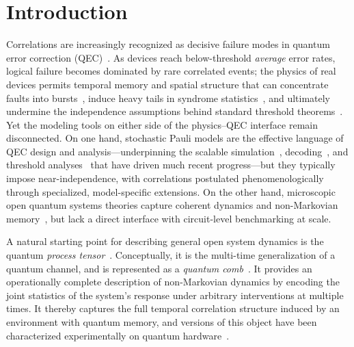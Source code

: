 \documentclass[
    aps,
    prx,
    reprint,
    superscriptaddress,
    longbibliography,
    nofootinbib,
    floatfix,
]{revtex4-2}
\begin{document}
\section{Introduction}\label{sec:introduction}
Correlations are increasingly recognized as decisive failure modes in quantum error correction (QEC)~\cite{harperLearningCorrelatedNoise2023,fkamDetrimentalNonMarkovianErrors2025}. As devices reach below-threshold \emph{average} error rates, logical failure becomes dominated by rare correlated events; the physics of real devices permits temporal memory and spatial structure that can concentrate faults into bursts~\cite{mcewenRemovingLeakageinducedCorrelated2021,mcewenResolvingCatastrophicError2022,googlequantumaiandcollaboratorsQuantumErrorCorrection2025,bratrudMeasurementCorrelatedCharge2025,harringtonSynchronousDetectionCosmic2025}, induce heavy tails in syndrome statistics~\cite{claderImpactCorrelationsHeavy2021}, and ultimately undermine the independence assumptions behind standard threshold theorems~\cite{terhalFaulttolerantQuantumComputation2005,aharonovFaultTolerantQuantumComputation2006,alickiInternalConsistencyFaulttolerant2006}. Yet the modeling tools on either side of the physics--QEC interface remain disconnected. On one hand, stochastic Pauli models are the effective language of QEC design and analysis---underpinning the scalable simulation~\cite{gidneyStimFastStabilizer2021}, decoding~\cite{higgottPyMatchingPythonPackage2022,higgottSparseBlossomCorrecting2025}, and threshold analyses~\cite{dennisTopologicalQuantumMemory2002,fowlerSurfaceCodesPractical2012} that have driven much recent progress---but they typically impose near-independence, with correlations postulated phenomenologically through specialized, model-specific extensions. On the other hand, microscopic open quantum systems theories capture coherent dynamics and non-Markovian memory~\cite{breuerTheoryOpenQuantum2007,breuerColloquiumNonMarkovianDynamics2016,milzQuantumStochasticProcesses2021}, but lack a direct interface with circuit-level benchmarking at scale.

A natural starting point for describing general open system dynamics is the quantum \emph{process tensor}~\cite{pollockNonMarkovianQuantumProcesses2018,costaQuantumCausalModelling2016,milzQuantumStochasticProcesses2021}. Conceptually, it is the multi-time generalization of a quantum channel, and is represented as a \emph{quantum comb}~\cite{chiribellaQuantumCircuitArchitecture2008,chiribellaTheoreticalFrameworkQuantum2009,oreshkovQuantumCorrelationsNo2012,whiteUnifyingNonMarkovianCharacterization2025,tarantoHigherOrderQuantumOperations2025}. It provides an operationally complete description of non-Markovian dynamics by encoding the joint statistics of the system's response under arbitrary interventions at multiple times. It thereby captures the full temporal correlation structure induced by an environment with quantum memory, and versions of this object have been characterized experimentally on quantum hardware~\cite{whiteDemonstrationNonMarkovianProcess2020,whiteNonMarkovianQuantumProcess2022,whiteManytimePhysicsPractice2024,zhangLearningForecastingOpen2025}.
\end{document}
